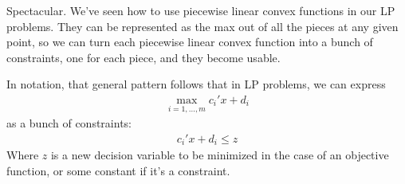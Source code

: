 \documentclass[12pt, letterpaper]{article}
\begin{document}
Spectacular. We've seen how to use piecewise linear convex functions in our LP problems.
They can be represented as the max out of all the pieces at any given point, so we can turn each
piecewise linear convex function into a bunch of constraints, one for each piece, and
they become usable.

In notation, that general pattern follows that in LP problems, we can express
\begin{gather*}
    \max_{i=1,\dots,m} c_i'x + d_i
\end{gather*}
as a bunch of constraints:
\begin{gather*}
    c_i'x + d_i \leq z
\end{gather*}
Where $z$ is a new decision variable to be minimized in the case of an objective function,
or some constant if it's a constraint.
\end{document}
